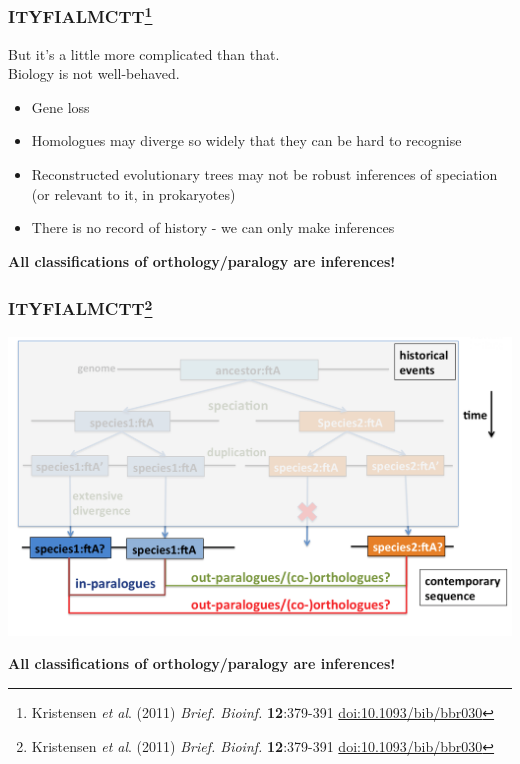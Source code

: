 % 
\begin{frame}
  \frametitle{ITYFIALMCTT\footnote{\tiny{Kristensen \textit{et al}. (2011) \textit{Brief. Bioinf.} \textbf{12}:379-391 \href{http://dx.doi.org/10.1093/bib/bbr030}{doi:10.1093/bib/bbr030}}}}
  But it's a little more complicated than that. \\
  Biology is not well-behaved.
  \begin{itemize}
    \item Gene loss
    \item Homologues may diverge so widely that they can be hard to recognise
    \item Reconstructed evolutionary trees may not be robust inferences of speciation (or relevant to it, in prokaryotes)
    \item There is no record of history - we can only make inferences
  \end{itemize}
  \textbf{All classifications of orthology/paralogy are inferences!}
\end{frame}

% 
\begin{frame}
  \frametitle{ITYFIALMCTT\footnote{\tiny{Kristensen \textit{et al}. (2011) \textit{Brief. Bioinf.} \textbf{12}:379-391 \href{http://dx.doi.org/10.1093/bib/bbr030}{doi:10.1093/bib/bbr030}}}}
  \begin{center}
    \includegraphics[width=1\textwidth]{images/logues6}  
  \end{center} 
  \textbf{All classifications of orthology/paralogy are inferences!}
\end{frame}

